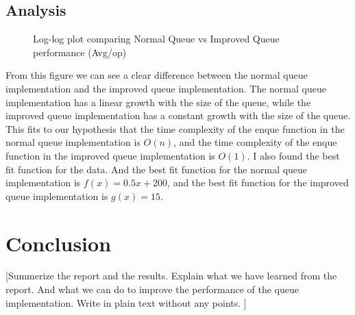 \subsection*{Analysis}
\begin{figure}[h]
    \centering
    \caption{Log-log plot comparing Normal Queue vs Improved Queue performance (Avg/op)}
    \label{fig:queue_comparison}
\end{figure}
From this figure we can see a clear difference between the normal queue implementation and the improved queue implementation. The normal queue implementation has a linear growth with the size of the queue, while the improved queue implementation has a constant growth with the size of the queue. This fits to our hypothesis that the time complexity of the enque function in the normal queue implementation is $O(n)$, and the time complexity of the enque function in the improved queue implementation is $O(1)$.
I also found the best fit function for the data. And the best fit function for the normal queue implementation is $f(x) = 0.5x + 200$, and the best fit function for the improved queue implementation is $g(x) = 15$.


\section*{Conclusion}
 [Summerize the report and the results. Explain what we have learned from the report. And what we can do to improve the performance of the queue implementation.
 Write in plain text without any points.
 ]


